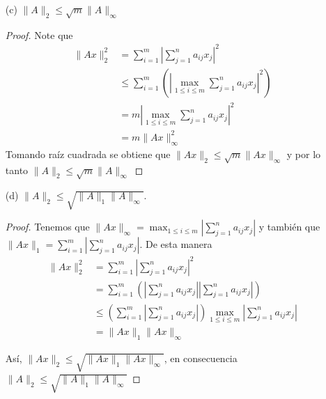 \begin{enumerate}
    \begin{proof}
    Primero note que $\|A^Te_i\|_2^2=\displaystyle{\sum_{j=1}^n |a_{ij}|^2}\leq \|A^T\|_2^2= \|A\|_2^2$. Ahora, sea $k \in \{1,\ldots,m\}$ tal que $\|A^Te_k\|_2^2=\displaystyle{\max_{1\leq i \leq m}\sum_{j=1}^{n}|a_{ij}|^2}$; usando la desigualdad de Cauchy-Schwartz obtenemos el siguiente resultado:
    \begin{align*}
    \|A\|_\infty^{2} & =\left(\max_{1\leq i \leq m}{\sum_{j=1}^n|a_{ij}|}\right)^2\\ 
        &\leq n\max_{1\leq i \leq m}{\sum_{j=1}^n|a_{ij}|^2}\\   
        &= n\|A^Te_k\|_2^2\\
        &\leq n\|A^T\|_2^2\\
        &= n\|A\|_2^2
    \end{align*}
    Tomando raíz cuadrada llegamos a que $\|A\|_\infty \leq \sqrt{n}\|A\|_2$.
    \end{proof}
    \item[(c)] $\|A\|_2 \leq \sqrt{m} \|A\|_\infty$\\

    \begin{proof}
    Note que
    \begin{align*}
    \|Ax\|_2^2 &= \sum_{i=1}^m\left|\sum_{j=1}^n a_{ij}x_{j}\right|^2\\ 
    &\leq \sum_{i=1}^m\left(\left|\max_{1\leq i \leq m}{\sum_{j=1}^n a_{ij}x_{j}}\right|^2\right)\\ 
    &= m\left|\max_{1\leq i \leq m}{\sum_{j=1}^n a_{ij}x_{j}}\right|^2\\ 
    &= m\|Ax\|_\infty^2
    \end{align*}
    Tomando raíz cuadrada se obtiene que $\|Ax\|_2\leq \sqrt{m}\|Ax\|_\infty$ y por lo tanto $\|A\|_2 \leq\sqrt{m} \|A\|_\infty$
    \end{proof}
    \item[(d)] $\|A\|_2 \leq \sqrt{\|A\|_1 \|A\|_\infty}.$\\

    \begin{proof}
    Tenemos que $\|Ax\|_\infty = \displaystyle{\max_{1 \leq i \leq m}{\left|\sum_{j=1}^{n}a_{ij}x_j\right|}}$ y también que $\|Ax\|_1 =\displaystyle{ \sum_{i=1}^m\left|\sum_{j=1}^{n}a_{ij}x_{j}\right|}$. De esta manera
    \begin{align*}
    \|Ax\|_2^2 & = \sum_{i=1}^m\left|\sum_{j=1}^{n}a_{ij}x_{j}\right|^2 \\ 
    & = \sum_{i=1}^m\left(\left|\sum_{j=1}^{n}a_{ij}x_{j}\right|\left|\sum_{j=1}^{n}a_{ij}x_{j}\right|\right) \\ 
    &\leq \left(\sum_{i=1}^m\left|\sum_{j=1}^{n}a_{ij}x_{j}\right|\right)\max_{1\leq i \leq m}{\left|\sum_{j=1}^{n}a_{ij}x_{j}\right|} \\ 
    & = \|Ax\|_1 \|Ax\|_\infty
    \end{align*}

    Así, $\|Ax\|_2\leq \sqrt{\|Ax\|_1 \|Ax\|_\infty}$, en consecuencia $\|A\|_2 \leq \sqrt{\|A\|_1 \|A\|_\infty}$
    \end{proof}
\end{enumerate}